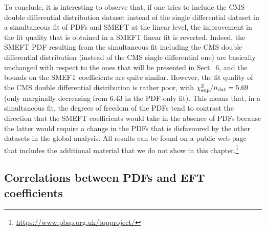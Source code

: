 \documentclass[withindex,glossary]{cam-thesis}
\begin{document}
 To conclude, it is interesting to observe that, if one
  tries to include the CMS double differential distribution dataset
  instead of the single differential dataset in a simultaneous fit of
  PDFs and SMEFT at the linear level, the improvement in the fit quality that is obtained
  in a SMEFT linear fit is reverted. Indeed, the SMEFT PDF resulting
  from the simultaneous fit including the CMS double differential
distribution (instead of the CMS single differential one) are
basically unchanged with respect to the ones that will be presented in
Sect.~6, and the bounds on the SMEFT coefficients are quite similar. However, 
the fit quality of the CMS double differential distribution is rather poor,
with $\chi^2_{\rm exp}/n_{\rm dat}=5.69$ (only marginally decreasing from 6.43 in the
PDF-only fit). 
This means that, in a simultaneous fit, the degrees of freedom of the PDFs
tend to contrast the direction that the SMEFT coefficients would take
in the absence of PDFs because the latter would require a change in
the PDFs that is disfavoured by the other datasets in the global
analysis. All results can be found on a public web page that
includes the additional material that we do not show in this chapter.\footnote{\url{https://www.pbsp.org.uk/topproject/}}




\subsection{Correlations between PDFs and EFT coefficients}
\label{subsec:pdfeftcorr}
\end{document}
